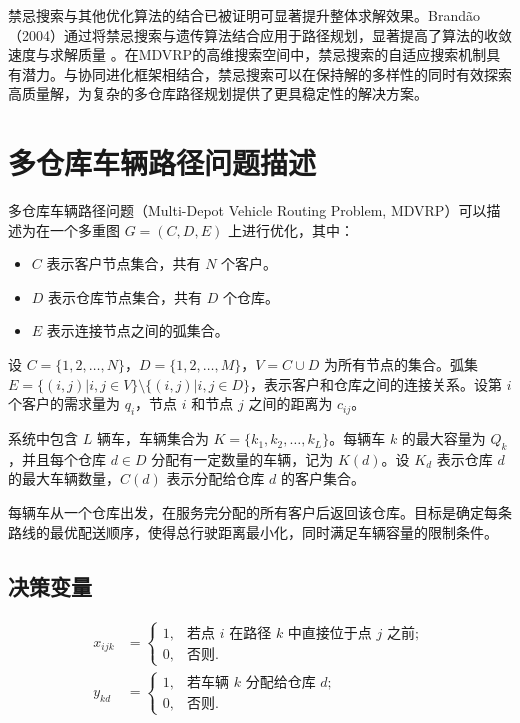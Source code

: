 \documentclass[12pt,a4paper,oneside]{ctexart}
\begin{document}
禁忌搜索与其他优化算法的结合已被证明可显著提升整体求解效果。Brandão（2004）通过将禁忌搜索与遗传算法结合应用于路径规划，显著提高了算法的收敛速度与求解质量 \cite{brandao2004tabu}。在MDVRP的高维搜索空间中，禁忌搜索的自适应搜索机制具有潜力。与协同进化框架相结合，禁忌搜索可以在保持解的多样性的同时有效探索高质量解，为复杂的多仓库路径规划提供了更具稳定性的解决方案。


\section{多仓库车辆路径问题描述}

多仓库车辆路径问题（Multi-Depot Vehicle Routing Problem, MDVRP）可以描述为在一个多重图 $G = (C, D, E)$ 上进行优化，其中：
\begin{itemize}
	\item $C$ 表示客户节点集合，共有 $N$ 个客户。
	\item $D$ 表示仓库节点集合，共有 $D$ 个仓库。
	\item $E$ 表示连接节点之间的弧集合。
\end{itemize}

设 $C = \{1, 2, \ldots, N\}$，$D = \{1, 2, \ldots, M\}$，$V = C \cup D$ 为所有节点的集合。弧集 $E = \{(i, j) | i, j \in V\} \setminus \{(i, j) | i, j \in D\}$，表示客户和仓库之间的连接关系。设第 $i$ 个客户的需求量为 $q_i$，节点 $i$ 和节点 $j$ 之间的距离为 $c_{ij}$。

系统中包含 $L$ 辆车，车辆集合为 $K = \{k_1, k_2, \ldots, k_L\}$。每辆车 $k$ 的最大容量为 $Q_k$，并且每个仓库 $d \in D$ 分配有一定数量的车辆，记为 $K(d)$。设 $K_d$ 表示仓库 $d$ 的最大车辆数量，$C(d)$ 表示分配给仓库 $d$ 的客户集合。

每辆车从一个仓库出发，在服务完分配的所有客户后返回该仓库。目标是确定每条路线的最优配送顺序，使得总行驶距离最小化，同时满足车辆容量的限制条件。

\subsection{决策变量}
\begin{align*}
	x_{ijk} &= 
	\begin{cases}
		1, & \text{若点 } i \text{ 在路径 } k \text{ 中直接位于点 } j \text{ 之前}; \\
		0, & \text{否则}.
	\end{cases} \\
	y_{kd} &= 
	\begin{cases}
		1, & \text{若车辆 } k \text{ 分配给仓库 } d; \\
		0, & \text{否则}.
	\end{cases}
\end{align*}
\end{document}
